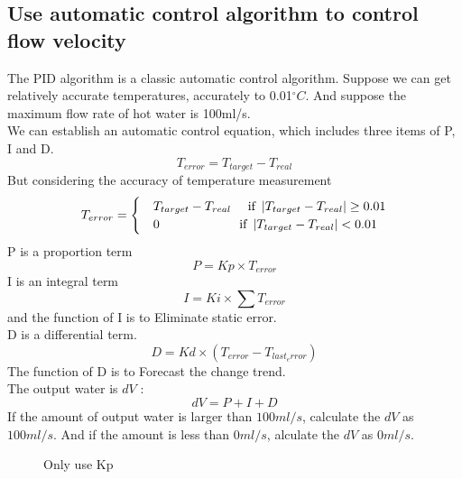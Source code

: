 \documentclass{mcmthesis}
\begin{document}
\subsection{Use automatic control algorithm to control flow velocity}
The PID algorithm is a classic automatic control algorithm. Suppose we can get relatively accurate temperatures, accurately to 0.01$^{\circ}C$. And suppose the maximum flow rate of hot water is 100ml/s.\\
\indent We can establish an automatic control equation, which includes three items of P, I and D.\\
\begin{equation}
T_{error}=T_{target}-T_{real}
\end{equation}
\indent But considering the accuracy of temperature measurement\\
\begin{equation}
	T_{error}=\begin{cases}
	&T_{target}-T_{real} \quad\text{ if }\left | T_{target}-T_{real} \right |\geq 0.01 \\ 
	&0\indent\indent\indent\indent \text{ if } \left | T_{target}-T_{real} \right |<0.01 
	\end{cases}
\end{equation}
\indent P is a proportion term
\begin{equation}
	P=Kp\times T_{error}
\end{equation}
\indent I is an integral term
\begin{equation}
	I=Ki\times \sum T_{error}
\end{equation}
and the function of I is to Eliminate static error.\\
\indent D is a differential term.
\begin{equation}
D=Kd\times (T_{error}-T_{last_error})
\end{equation}
\indent The function of D is to Forecast the change trend.\\
\indent The output water is $dV$ :
\begin{equation}
	dV=P+I+D
\end{equation}
\indent If the amount of output water is larger than $100ml/s$, calculate the $dV$ as $100ml/s$. And if the amount is less than $0ml/s$, alculate the $dV$ as $0ml/s$. 
\begin{figure}[H]
\centering
{}
\caption{Only use Kp}
\label{PID1}
\end{figure}
\end{document}
